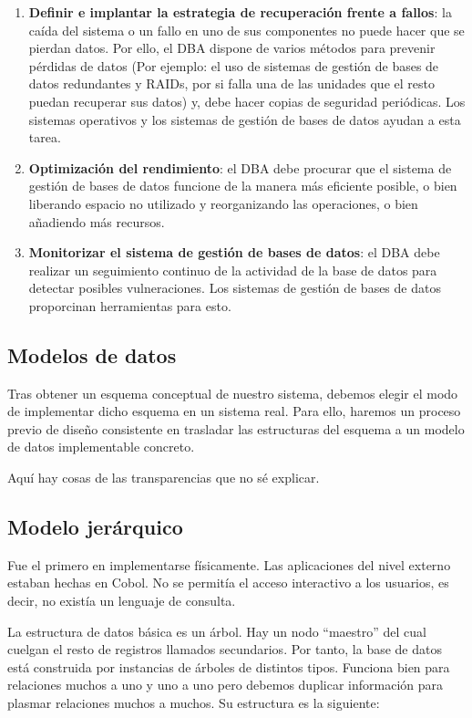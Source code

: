 \documentclass[10pt,a4paper,spanish]{report}
\begin{document}
\begin{enumerate}[$\heartsuit$]
    \item \textcolor[rgb]{1,0.2,0.3}{\textbf{Definir e implantar la estrategia de recuperación frente a fallos}}: la caída del sistema o un fallo en uno de sus componentes no puede hacer que se pierdan datos. Por ello, el DBA dispone de varios métodos para prevenir pérdidas de datos (Por ejemplo: el uso de sistemas de gestión de bases de datos redundantes y RAIDs, por si falla una de las unidades que el resto puedan recuperar sus datos) y, debe hacer copias de seguridad periódicas. Los sistemas operativos y los sistemas de gestión de bases de datos ayudan a esta tarea.

    \item \textcolor[rgb]{1,0.2,0.3}{\textbf{Optimización del rendimiento}}: el DBA debe procurar que el sistema de gestión de bases de datos funcione de la manera más eficiente posible, o bien liberando espacio no utilizado y reorganizando las operaciones, o bien añadiendo más recursos.

    \item \textcolor[rgb]{1,0.2,0.3}{\textbf{Monitorizar el sistema de gestión de bases de datos}}: el DBA debe realizar un seguimiento continuo de la actividad de la base de datos para detectar posibles vulneraciones. Los sistemas de gestión de bases de datos proporcinan herramientas para esto.
\end{enumerate}

\textcolor[rgb]{1,0.2,0.3}{\chapter{Modelos de datos}}
Tras obtener un esquema conceptual de nuestro sistema, debemos elegir el modo de implementar dicho esquema en un sistema real. Para ello, haremos un proceso previo de diseño consistente en trasladar las estructuras del esquema a un modelo de datos implementable concreto.

Aquí hay cosas de las transparencias que no sé explicar.

\textcolor[rgb]{1,0.2,0.3}{\section{Modelo jerárquico}}
Fue el primero en implementarse físicamente. Las aplicaciones del nivel externo estaban hechas en Cobol. No se permitía el acceso interactivo a los usuarios, es decir, no existía un lenguaje de consulta.

La estructura de datos básica es un árbol. Hay un nodo ``maestro'' del cual cuelgan el resto de registros llamados secundarios. Por tanto, la base de datos está construida por instancias de árboles de distintos tipos. Funciona bien para relaciones muchos a uno y uno a uno pero debemos duplicar información para plasmar relaciones muchos a muchos. Su estructura es la siguiente:
\end{document}
